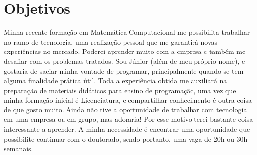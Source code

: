\documentclass[11pt]{article}
\begin{document}
\section{Objetivos \dotfill}
Minha recente formação em Matemática Computacional me possibilita trabalhar no ramo de tecnologia, uma realização pessoal  que me garantirá novas experiências no mercado. Poderei aprender muito com a empresa e também me desafiar com os problemas tratados. Sou Júnior (além de meu próprio nome), e gostaria de saciar minha vontade de programar,  principalmente quando se tem alguma finalidade prática útil. Toda a experiência obtida me auxiliará na preparação de materiais didáticos para ensino de programação, uma vez que minha formação inicial é Licenciatura, e compartilhar conhecimento é outra coisa de que gosto muito. Ainda não tive a oportunidade de trabalhar com tecnologia em uma empresa ou em grupo, mas adoraria! Por esse motivo terei bastante coisa interessante a aprender. A minha necessidade é encontrar uma oportunidade que possibilite continuar com o doutorado, sendo portanto, uma vaga de 20h ou 30h semanais.
 
\end{document}

